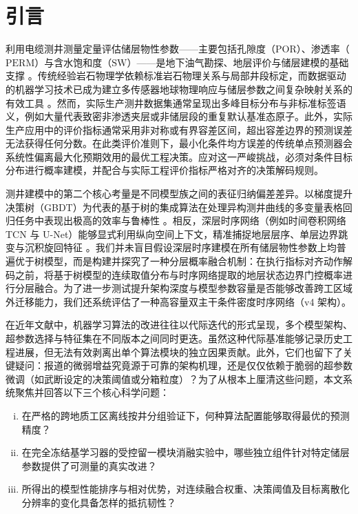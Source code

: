 \documentclass[preprint,12pt,nopreprintline]{elsarticle}
\begin{document}
\section{引言}
\label{sec:intro}
利用电缆测井测量定量评估储层物性参数——主要包括孔隙度（$\mathrm{POR}$）、渗透率（$\mathrm{PERM}$）与含水饱和度（$\mathrm{SW}$）——是地下油气勘探、地层评价与储层建模的基础支撑 \cite{archie1942,wyllie1958,waxman1968}。传统经验岩石物理学依赖标准岩石物理关系与局部井段标定，而数据驱动的机器学习技术已成为建立多传感器地球物理响应与储层参数之间复杂映射关系的有效工具 \cite{anifowose2017,almudhafar2019,bressan2020}。然而，实际生产测井数据集通常呈现出多峰目标分布与非标准标签语义，例如大量代表致密非渗透夹层或非储层段的重复默认基准态原子。此外，实际生产应用中的评价指标通常采用非对称或有界容差区间，超出容差边界的预测误差无法获得任何分数。在此类评价准则下，最小化条件均方误差的传统单点预测器会系统性偏离最大化预期效用的最优工程决策。应对这一严峻挑战，必须对条件目标分布进行概率建模，并配合与实际工程评价指标严格对齐的决策解码规则。

测井建模中的第二个核心考量是不同模型族之间的表征归纳偏差差异。以梯度提升决策树（GBDT）为代表的基于树的集成算法在处理异构测井曲线的多变量表格回归任务中表现出极高的效率与鲁棒性 \cite{prokhorenkova2018catboost,ke2017lightgbm}。相反，深层时序网络（例如时间卷积网络 TCN 与 U-Net）能够显式利用纵向空间上下文，精准捕捉地层层序、单层边界跳变与沉积旋回特征 \cite{bai2018tcn,ronneberger2015unet}。我们并未盲目假设深层时序建模在所有储层物性参数上均普遍优于树模型，而是构建并探究了一种分层概率融合机制：在执行指标对齐动作解码之前，将基于树模型的连续取值分布与时序网络提取的地层状态边界门控概率进行分层融合。为了进一步测试提升架构深度与模型参数容量是否能够改善跨工区域外迁移能力，我们还系统评估了一种高容量双主干条件密度时序网络（v4 架构）。

在近年文献中，机器学习算法的改进往往以代际迭代的形式呈现，多个模型架构、超参数选择与特征集在不同版本之间同时更迭。虽然这种代际基准能够记录历史工程进展，但无法有效剥离出单个算法模块的独立因果贡献。此外，它们也留下了关键疑问：报道的微弱增益究竟源于可靠的架构机理，还是仅仅依赖于脆弱的超参数微调（如武断设定的决策阈值或分箱粒度）？为了从根本上厘清这些问题，本文系统聚焦并回答以下三个核心科学问题：
\begin{enumerate}[(i)]
\item 在严格的跨地质工区离线按井分组验证下，何种算法配置能够取得最优的预测精度？
\item 在完全冻结基学习器的受控留一模块消融实验中，哪些独立组件针对特定储层参数提供了可测量的真实改进？
\item 所得出的模型性能排序与相对优势，对连续融合权重、决策阈值及目标离散化分辨率的变化具备怎样的抵抗韧性？
\end{enumerate}
\end{document}
